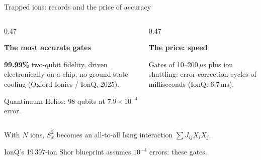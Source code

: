 \documentclass[aspectratio=169,11pt]{beamer}
\newcommand{\blocktitle}[1]{{\bfseries #1}\par\vskip1mm}
\newcommand{\peachtitle}[1]{{\bfseries\color{cverm}#1}\par\vskip1mm}
\begin{document}
\begin{frame}{Trapped ions: records and the price of accuracy}
  \begin{columns}[T]
    \begin{column}{0.47\textwidth}
      \begin{greyblock}
        \blocktitle{The most accurate gates}
        \textbf{99.99\%} two-qubit fidelity, driven electronically on a chip, no ground-state cooling (Oxford Ionics / IonQ, 2025).\par
        \vskip1mm
        Quantinuum Helios: 98 qubits at $7.9\times10^{-4}$ error.
      \end{greyblock}
    \end{column}
    \begin{column}{0.47\textwidth}
      \begin{peachblock}
        \peachtitle{The price: speed}
        Gates of 10--200\,$\mu$s plus ion shuttling: error-correction cycles of milliseconds (IonQ: 6.7\,ms).
      \end{peachblock}
    \end{column}
  \end{columns}
  \vskip2mm
  With $N$ ions, $S_x^2$ becomes an all-to-all Ising interaction $\sum J_{ij}X_iX_j$.
  \begin{takeaway}IonQ's 19\,397-ion Shor blueprint assumes $10^{-4}$ errors: these gates.\end{takeaway}
\end{frame}
\end{document}
